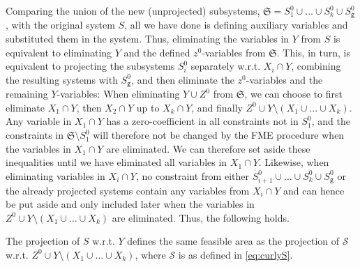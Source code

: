 \documentclass[citeauthoryear]{llncs}
\newcommand{\trt}[1]{\texttt{#1}}
\begin{document}
\normalsize{Comparing the union of the new (unprojected) subsystems, $\mathfrak{S} = S_1^0\cup\ldots\cup S_k^0\cup S_\trt{g}^0$, with the original system $S$, all we have done is defining auxiliary variables and substituted them in the system. Thus, eliminating the variables in $Y$ from $S$ is equivalent to eliminating $Y$ and the defined $z^0$-variables from $\mathfrak{S}$.} This, in turn, is equivalent to projecting the subsystems $S^0_i$ separately w.r.t. $X_i\cap Y$, combining the resulting systems with $S^0_\trt{g}$, and then eliminate the $z^0$-variables and the remaining $Y$-variables: %
%
When eliminating $Y\cup Z^0$ from $\mathfrak{S}$, we can choose to first eliminate $X_1\cap Y$, then $X_2\cap Y$ up to $X_k\cap Y$, and finally $Z^0\cup Y\setminus(X_1\cup \ldots\cup X_k)$. 
Any variable in $X_1\cap Y$ has a zero-coefficient in all constraints not in $S^0_1$, and the constraints in $\mathfrak{S}\setminus S^0_1$ will therefore not be changed by the FME procedure when the variables in $X_1\cap Y$ are eliminated.  We can therefore set aside these inequalities until we have eliminated all variables in $X_1\cap Y$. Likewise, when eliminating variables in $X_i\cap Y$, no constraint from either $S_{i+1}^0\cup \ldots \cup S_k^0\cup S_\trt{g}^0$ or the already projected systems contain any variables from $X_i\cap Y$ and can hence be put aside and only included later when the variables in $Z^0\cup Y\setminus(X_1\cup \ldots\cup X_k)$ are eliminated. Thus, the following holds. 
\begin{proposition}
{The projection of $S$ w.r.t. $Y$ defines the same feasible area as 
the projection of $\mathcal{S}$ w.r.t. $Z^0 \cup Y\setminus (X_1\cup \ldots \cup X_k)$, where
$\mathcal{S}$ is as defined in \eqref{eq:curlyS}.%
}
\end{proposition}
\end{document}
